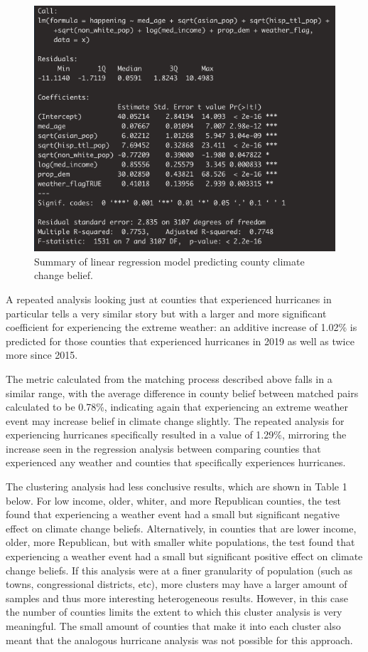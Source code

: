 \documentclass{article}
\begin{document}
\begin{figure}[H]
\centering
\includegraphics[scale=0.4]{images/regression_summary.png}
\caption{Summary of linear regression model predicting county climate change belief.}
\end{figure}

A repeated analysis looking just at counties that experienced hurricanes in particular tells a very similar story but with a larger and more significant coefficient for experiencing the extreme weather: an additive increase of 1.02\% is predicted for those counties that experienced hurricanes in 2019 as well as twice more since 2015. 

The metric calculated from the matching process described above falls in a similar range, with the average difference in county belief between matched pairs calculated to be 0.78\%, indicating again that experiencing an extreme weather event may increase belief in climate change slightly. The repeated analysis for experiencing hurricanes specifically resulted in a value of 1.29\%, mirroring the increase seen in the regression analysis between comparing counties that experienced any weather and counties that specifically experiences hurricanes.

The clustering analysis had less conclusive results, which are shown in Table 1 below. For low income, older, whiter, and more Republican counties, the test found that experiencing a weather event had a small but significant negative effect on climate change beliefs. Alternatively, in counties that are lower income, older, more Republican, but with smaller white populations, the test found that experiencing a weather event had a small but significant positive effect on climate change beliefs. If this analysis were at a finer granularity of population (such as towns, congressional districts, etc), more clusters may have a larger amount of samples and thus more interesting heterogeneous results. However, in this case the number of counties limits the extent to which this cluster analysis is very meaningful. The small amount of counties that make it into each cluster also meant that the analogous hurricane analysis was not possible for this approach.  
\end{document}
